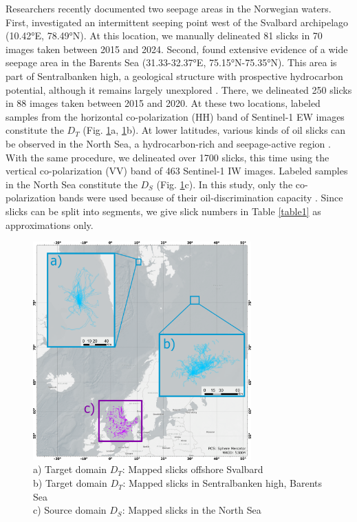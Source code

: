 \documentclass[lettersize,journal]{IEEEtran}
\begin{document}
Researchers recently documented two seepage areas in the Norwegian waters. 
First, \cite{panieriArcticNaturalOil2024} investigated an intermittent seeping point west of the Svalbard archipelago (10.42°E, 78.49°N). At this location, we manually delineated 81 slicks 
in 70 images taken between 2015 and 2024. Second, \cite{serovWidespreadNaturalMethane2023,ivanovSearchDetectionNatural2020} found extensive evidence of a wide seepage area in the Barents Sea (31.33-32.37°E, 75.15°N-75.35°N). 
This area is part of Sentralbanken high, a geological structure with prospective hydrocarbon potential, although it remains largely unexplored \cite{lundschienNorthBarentsComposite2025}. 
There, we delineated 250 slicks in 88 images taken between 2015 and 2020. At these two locations, labeled samples from the horizontal co-polarization (HH) band of Sentinel-1 EW images constitute the 
$\mathit{D}_T$ (Fig. \ref{figure1}a, \ref{figure1}b). At lower latitudes, various kinds of oil slicks can be observed in the North Sea, a hydrocarbon-rich and seepage-active region \cite{hovlandChapter2Focus1988}. 
With the same procedure, we delineated over 1700 slicks, this time using the vertical co-polarization (VV) band of 463 Sentinel-1 IW images. Labeled samples in the North Sea constitute the $\mathit{D}_S$ (Fig. \ref{figure1}c). 
In this study, only the co-polarization bands were used because of their oil-discrimination capacity \cite{kudryavtsevDualCoPolarizedSAR2013,johanssonMultifrequencyPolarimetricSAR2017,brekkeSAROilSpill2020}. 
Since slicks can be split into segments, we give slick numbers in Table \ref{table1} as approximations only.
\begin{figure}[!t]
    \centering
    \includegraphics[width=3.3in]{figures/layout2_grids.png} %
    \caption{a) Target domain \( \mathit{D}_T \): Mapped slicks offshore Svalbard \\ \quad b) Target domain \( \mathit{D}_T \): Mapped slicks in Sentralbanken high, Barents Sea \\ 
    \quad c) Source domain \( \mathit{D}_S \): Mapped slicks in the North Sea}
    \label{figure1}
\end{figure}
\end{document}
